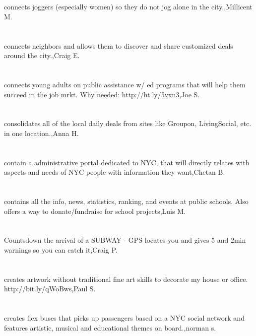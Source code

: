 \section{} connects joggers (especially women) so they do not jog alone in the city.,Millicent M.	
\section{}connects neighbors and allows them to discover and share customized deals around the city.,Craig E.	
\section{}connects young adults on public assistance w/ ed programs that will help them succeed in the job mrkt. Why needed: http://ht.ly/5vxn3,Joe S.	
\section{}  consolidates all of the local daily deals from sites like Groupon, LivingSocial, etc. in one location.,Anna H.	
\section{}contain a administrative portal dedicated to NYC, that will directly relates with aspects and needs of NYC people with information they want,Chetan B.	
\section{}contains all the info, news, statistics, ranking, and events at public schools. Also offers a way to donate/fundraise for school projects,Luis M.	
\section{}Countsdown the arrival of a SUBWAY - GPS locates you and gives 5 and 2min warnings so you can catch it,Craig P.	
\section{}creates artwork without traditional fine art skills to decorate my house or office. http://bit.ly/qWoBws,Paul S.	
\section{}creates flex buses that picks up passengers based on a NYC social network and features artistic, musical  and educational themes on board.,norman s.	
